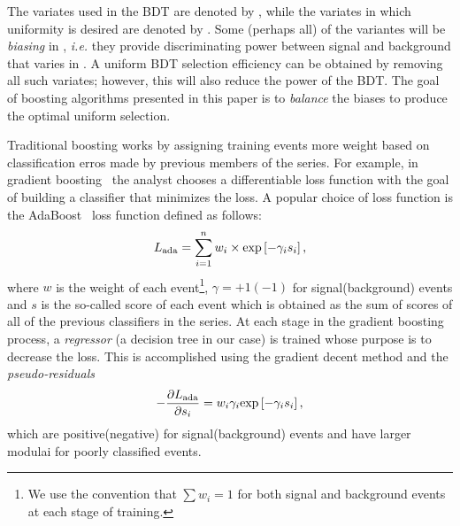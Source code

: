 The variates used in the BDT are denoted by \x, while the variates in which uniformity is desired are denoted by \y.  Some (perhaps all) of the \x variantes will be {\em biasing} in \y, {\em i.e.} they provide discriminating power between signal and background that varies in \y.  A uniform BDT selection efficiency can be obtained by removing all such variates; however, this will also reduce the power of the BDT.  The goal of boosting algorithms presented in this paper is to {\em balance} the biases to produce the optimal uniform selection.

Traditional boosting works by assigning training events more weight based on classification erros made by previous members of the series.  For example, in gradient boosting~\cite{ref:gradboost} the analyst chooses a differentiable loss function with the goal of building a classifier that minimizes the loss.  
A popular choice of loss function is the AdaBoost~\cite{ref:adaboost} loss function defined as follows:
\begin{equation}
L_{\rm ada} = \sum\limits_{i=1}^{n}w_i \times {\rm exp}\left[-\gamma_i s_i\right], 
\end{equation}
where $w$ is the weight of each event\footnote{We use the convention that $\sum w_i = 1$ for both signal and background events at each stage of training.}, $\gamma = +1(-1)$ for signal(background) events and $s$ is the so-called score of each event which is obtained as the sum of scores of all of the previous classifiers in the series.   
At each stage in the gradient boosting process, a {\em regressor} (a decision tree in our case) is trained whose purpose is to decrease the loss.  This is accomplished using the gradient decent method and the {\em pseudo-residuals}
\begin{equation}
  -\frac{\partial L_{\rm ada}}{\partial s_i} = w_i \gamma_i  {\rm exp}\left[-\gamma_i s_i\right],
\end{equation}
which are positive(negative) for signal(background) events and have larger modulai for poorly classified events.


